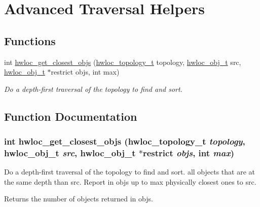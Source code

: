 \hypertarget{group__hwlocality__helper__traversal}{
\section{Advanced Traversal Helpers}
\label{group__hwlocality__helper__traversal}
}
\subsection*{Functions}
\begin{DoxyCompactItemize}
\item 
int \hyperlink{group__hwlocality__helper__traversal_gab761df678cab3699bd1a1d057e98bf1b}{hwloc\_\-get\_\-closest\_\-objs} (\hyperlink{group__hwlocality__topology_ga9d1e76ee15a7dee158b786c30b6a6e38}{hwloc\_\-topology\_\-t} topology, \hyperlink{structhwloc__obj}{hwloc\_\-obj\_\-t} src, \hyperlink{structhwloc__obj}{hwloc\_\-obj\_\-t} $\ast$restrict objs, int max)
\begin{DoxyCompactList}\small\item\em Do a depth-\/first traversal of the topology to find and sort. \item\end{DoxyCompactList}\end{DoxyCompactItemize}


\subsection{Function Documentation}
\hypertarget{group__hwlocality__helper__traversal_gab761df678cab3699bd1a1d057e98bf1b}{
\subsubsection[{hwloc\_\-get\_\-closest\_\-objs}]{\setlength{\rightskip}{0pt plus 5cm}int hwloc\_\-get\_\-closest\_\-objs ({\bf hwloc\_\-topology\_\-t} {\em topology}, \/  {\bf hwloc\_\-obj\_\-t} {\em src}, \/  {\bf hwloc\_\-obj\_\-t} $\ast$restrict {\em objs}, \/  int {\em max})}}
\label{group__hwlocality__helper__traversal_gab761df678cab3699bd1a1d057e98bf1b}


Do a depth-\/first traversal of the topology to find and sort. all objects that are at the same depth than {\ttfamily src}. Report in {\ttfamily objs} up to {\ttfamily max} physically closest ones to {\ttfamily src}.

\begin{DoxyReturn}{Returns}
the number of objects returned in {\ttfamily objs}. 
\end{DoxyReturn}
